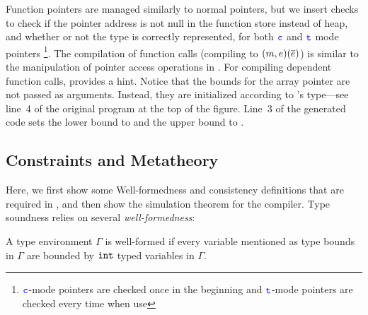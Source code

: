 
%
Function pointers are managed similarly to normal pointers,
but we insert checks to check if the pointer address is not null in 
the function store instead of heap, and whether or not the type is correctly represented, 
for both $\textcolor{blue}{\texttt{c}}$ and $\textcolor{blue}{\texttt{t}}$ mode pointers 
\footnote{$\textcolor{blue}{\texttt{c}}$-mode pointers are checked once in the beginning and $\textcolor{blue}{\texttt{t}}$-mode pointers are checked every time when use}.
The compilation of function calls (compiling to ${(m,e)}({\overline{e}})$) 
is similar to the manipulation of pointer access operations in .
For compiling dependent function calls,
 provides a hint.
Notice that the bounds for the array pointer  are not passed as
arguments. Instead, they are initialized according to 's
type---see line~4 of the original \lang program at the top of the figure.
Line~$3$ of the generated code
sets the lower bound  to  and the
upper bound to .

\subsection{Constraints and Metatheory}
\label{sec:meta}

Here, we first show some Well-formedness and consistency definitions that are required in , and then show the simulation theorem for the \lang compiler.
Type soundness relies on several \emph{well-formedness}:

\begin{definition}\label{type-wellformed}
A type environment $\Gamma$ is well-formed if every variable mentioned as type bounds in $\Gamma$ are bounded by $\mathtt{int}$ typed variables in $\Gamma$.
\end{definition}

